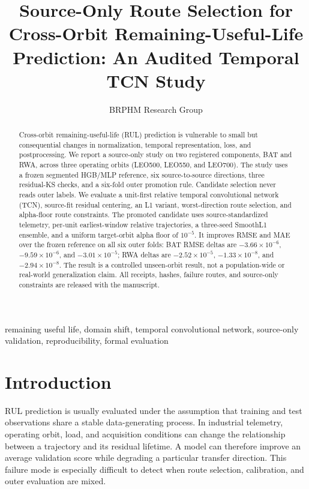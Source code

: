\documentclass[conference]{IEEEtran}
\title{Source-Only Route Selection for Cross-Orbit Remaining-Useful-Life Prediction: An Audited Temporal TCN Study}
\author{BRPHM Research Group}
\begin{document}
\sloppy
\maketitle

\begin{abstract}
Cross-orbit remaining-useful-life (RUL) prediction is vulnerable to small but consequential changes in normalization, temporal representation, loss, and postprocessing. We report a source-only study on two registered components, BAT and RWA, across three operating orbits (LEO500, LEO550, and LEO700). The study uses a frozen segmented HGB/MLP reference, six source-to-source directions, three residual-KS checks, and a six-fold outer promotion rule. Candidate selection never reads outer labels. We evaluate a unit-first relative temporal convolutional network (TCN), source-fit residual centering, an L1 variant, worst-direction route selection, and alpha-floor route constraints. The promoted candidate uses source-standardized telemetry, per-unit earliest-window relative trajectories, a three-seed SmoothL1 ensemble, and a uniform target-orbit alpha floor of $10^{-5}$. It improves RMSE and MAE over the frozen reference on all six outer folds: BAT RMSE deltas are $-3.66\times10^{-6}$, $-9.59\times10^{-6}$, and $-3.01\times10^{-5}$; RWA deltas are $-2.52\times10^{-5}$, $-1.33\times10^{-8}$, and $-2.94\times10^{-8}$. The result is a controlled unseen-orbit result, not a population-wide or real-world generalization claim. All receipts, hashes, failure routes, and source-only constraints are released with the manuscript.
\end{abstract}
\begin{IEEEkeywords}
remaining useful life, domain shift, temporal convolutional network, source-only validation, reproducibility, formal evaluation
\end{IEEEkeywords}

\section{Introduction}
RUL prediction is usually evaluated under the assumption that training and test observations share a stable data-generating process. In industrial telemetry, operating orbit, load, and acquisition conditions can change the relationship between a trajectory and its residual lifetime. A model can therefore improve an average validation score while degrading a particular transfer direction. This failure mode is especially difficult to detect when route selection, calibration, and outer evaluation are mixed.
\end{document}
